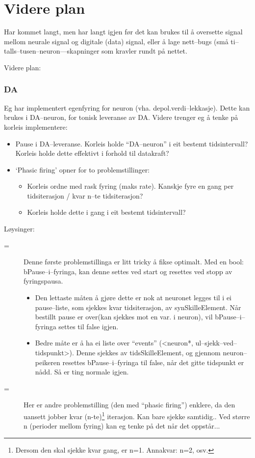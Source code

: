 
\chapter{Videre plan}

Har kommet langt, men har langt igjen før det kan brukes til å oversette signal mellom neurale signal og digitale (data) signal, eller å lage nett--bugs (små ti--talls--tusen--neuron---skapninger som kravler rundt på nettet.

Videre plan:

\subsection{DA}
Eg har implementert egenfyring for neuron (vha. depol.verdi--lekkasje). Dette kan brukes i DA--neuron, for tonisk leveranse av DA. Videre trenger eg å tenke på korleis implementere:
	\begin{itemize}
		\item Pause i DA--leveranse. Korleis holde ``DA--neuron'' i eit bestemt tidsintervall? Korleis holde dette effektivt i forhold til datakraft?
		\item `Phasic firing' opner for to problemstillinger:
		\begin{itemize}
			\item Korleis ordne med rask fyring (maks rate). Kanskje fyre en gang per tidsiterasjon / kvar n--te tidsiterasjon?
			\item Korleis holde dette i gang i eit bestemt tidsintervall?
		\end{itemize}
	\end{itemize}
Løysinger:
	\begin{description} 
		\item [=] Denne første problemstillinga er litt tricky å fikse optimalt. Med en bool: bPause--i--fyringa, kan denne settes ved start og resettes ved stopp av fyringspausa.
		\begin{itemize}
			\item Den lettaste måten å gjøre dette er nok at neuronet legges til i ei pause--liste, som sjekkes kvar tidsiterasjon, av synSkilleElement. Når bestillt pause er over(kan sjekkes mot en var. i neuron), vil bPause--i--fyringa settes til false igjen. 
			\item Bedre måte er å ha ei liste over ``events'' (<neuron*, ul--sjekk--ved--tidspunkt>). Denne sjekkes av tidsSkilleElement, og gjennom neuron--peikeren resettes bPause--i--fyringa til false, når det gitte tidspunkt er nådd. Så er ting normale igjen.
		\end{itemize}
		\item [=] Her er andre problemstilling (den med ``phasic firing'') enklere, da den uansett jobber kvar (n-te)\footnote{Dersom den skal sjekke kvar gang, er n=1. Annakvar: n=2, osv.} iterasjon. Kan bare sjekke samtidig.. Ved større n (perioder mellom fyring) kan eg tenke på det når det oppstår...
	\end{description}

